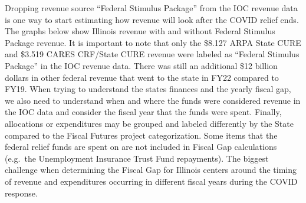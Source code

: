 \documentclass[
  letterpaper,
  DIV=11,
  numbers=noendperiod]{scrreport}
\begin{document}
Dropping revenue source ``Federal Stimulus Package'' from the IOC
revenue data is one way to start estimating how revenue will look after
the COVID relief ends. The graphs below show Illinois revenue with and
without Federal Stimulus Package revenue. It is important to note that
only the \$8.127 ARPA State CURE and \$3.519 CARES CRF/State CURE
revenue were labeled as ``Federal Stimulus Package'' in the IOC revenue
data. There was still an additional \$12 billion dollars in other
federal revenue that went to the state in FY22 compared to FY19. When
trying to understand the states finances and the yearly fiscal gap, we
also need to understand when and where the funds were considered revenue
in the IOC data and consider the fiscal year that the funds were spent.
Finally, allocations or expenditures may be grouped and labeled
differently by the State compared to the Fiscal Futures project
categorization. Some items that the federal relief funds are spent on
are not included in Fiscal Gap calculations (e.g.~the Unemployment
Insurance Trust Fund repayments). The biggest challenge when determining
the Fiscal Gap for Illinois centers around the timing of revenue and
expenditures occurring in different fiscal years during the COVID
response.
\end{document}
